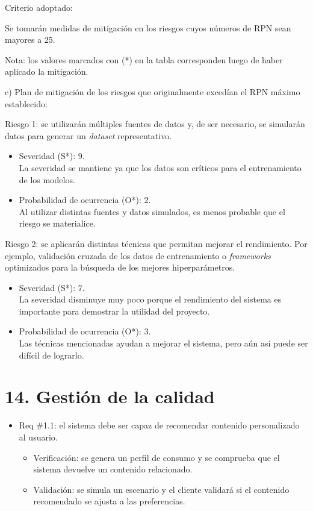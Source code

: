 \documentclass[
11pt, %
]{charter}
\begin{document}
Criterio adoptado: 

Se tomarán medidas de mitigación en los riesgos cuyos números de RPN sean mayores a 25.

Nota: los valores marcados con (*) en la tabla corresponden luego de haber aplicado la mitigación.

c) Plan de mitigación de los riesgos que originalmente excedían el RPN máximo establecido:
 
Riesgo 1: se utilizarán múltiples fuentes de datos y, de ser necesario, se simularán datos para generar un \textit{dataset} representativo.
  \begin{itemize}
	\item Severidad (S*): 9.\\
          La severidad se mantiene ya que los datos son críticos para el entrenamiento de los modelos.
	\item Probabilidad de ocurrencia (O*): 2.\\
          Al utilizar distintas fuentes y datos simulados, es menos probable que el riesgo se materialice.
	\end{itemize}

Riesgo 2: se aplicarán distintas técnicas que permitan mejorar el rendimiento. Por ejemplo, validación cruzada de los datos de entrenamiento o \textit{frameworks} optimizados para la búsqueda de los mejores hiperparámetros.
  \begin{itemize}
	\item Severidad (S*): 7.\\
          La severidad disminuye muy poco porque el rendimiento del sistema es importante para demostrar la utilidad del proyecto.
	\item Probabilidad de ocurrencia (O*): 3.\\
          Las técnicas mencionadas ayudan a mejorar el sistema, pero aún así puede ser difícil de lograrlo.
	\end{itemize}


\section{14. Gestión de la calidad}
\label{sec:calidad}


\begin{itemize} 
\item Req \#1.1: el sistema debe ser capaz de recomendar contenido personalizado al usuario.

\begin{itemize}
	\item Verificación: se genera un perfil de consumo y se comprueba que el sistema devuelve un contenido relacionado.
	\item Validación: se simula un escenario y el cliente validará si el contenido recomendado se ajusta a las preferencias. 
\end{itemize}

\end{itemize}
\end{document}
